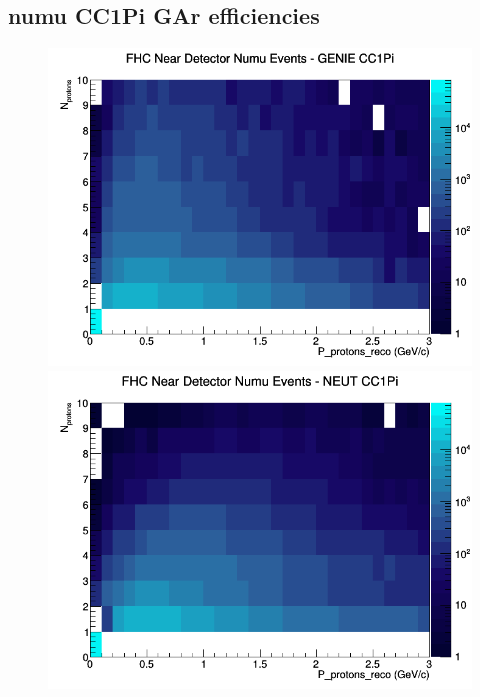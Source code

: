 \documentclass[12pt]{article}
\begin{document}
\subsection{numu CC1Pi GAr efficiencies}
\begin{figure}[h]
\includegraphics[width=\linewidth]{eff_N_P/GAr/protons/CC1Pi_FHC_ND_numu_N_P_GENIE.png}
\endminipage
{}
\includegraphics[width=\linewidth]{eff_N_P/GAr/protons/CC1Pi_FHC_ND_numu_N_P_NEUT.png}
\endminipage
{}

\end{figure}
\end{document}
